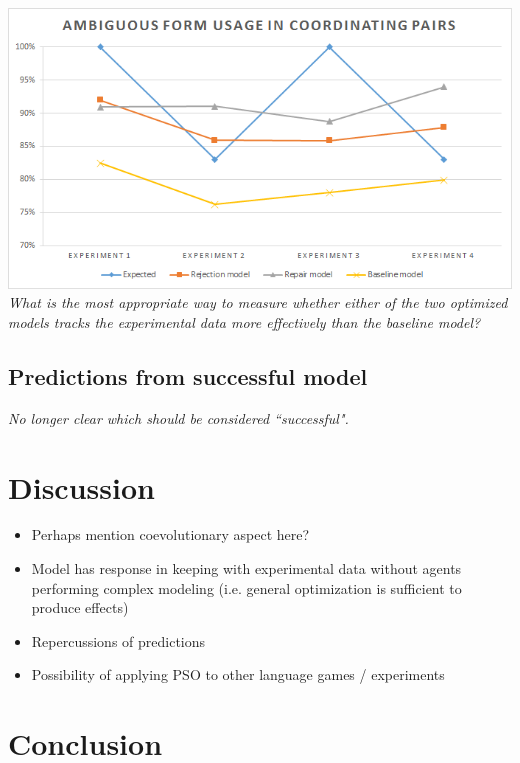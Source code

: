\documentclass[12pt,a4paper]{article}
\begin{document}
\begin{center}
\includegraphics[width=\textwidth]{ambiguous_vs_unambiguous_smaller.png}
\textit{What is the most appropriate way to measure whether either of the two optimized models tracks the experimental data more effectively than the baseline model?}
\end{center}

\subsection{Predictions from successful model}
\textit{No longer clear which should be considered ``successful".}

\section{Discussion}
\begin{itemize}
\item Perhaps mention coevolutionary aspect here?

\item Model has response in keeping with experimental data without agents performing complex modeling (i.e. general optimization is sufficient to produce effects)

\item Repercussions of predictions

\item Possibility of applying PSO to other language games / experiments

\end{itemize}
\section{Conclusion}





\end{document}
